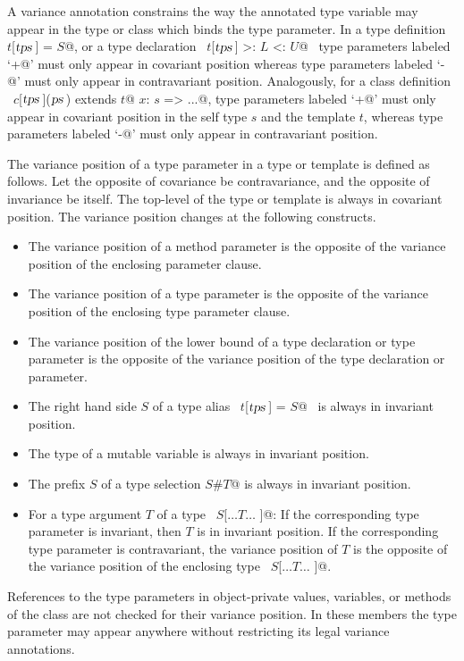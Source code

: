 A variance annotation constrains the way the annotated type variable
may appear in the type or class which binds the type parameter.  In a
type definition ~\lstinline@type $t$[$\mbox{\sl tps}\,$] = $S$@, or a type declaration ~\lstinline@type $t$[$\mbox{\sl tps}\,$] >: $L$ <: $U$@~ type parameters labeled
`\lstinline@+@' must only appear in covariant position whereas
type parameters labeled `\lstinline@-@' must only appear in contravariant
position. Analogously, for a class definition
~\lstinline@class $c$[$\mbox{\sl tps}\,$]($\mbox{\sl ps}\,$) extends $t$@ { $x$: $s$ => ...}@, type parameters labeled
`\lstinline@+@' must only appear in covariant position in the
self type $s$ and the template $t$, whereas type
parameters labeled `\lstinline@-@' must only appear in contravariant
position. 

The variance position of a type parameter in a type or template is
defined as follows.  Let the opposite of covariance be contravariance,
and the opposite of invariance be itself.  The top-level of the type
or template is always in covariant position. The variance position
changes at the following constructs.
\begin{itemize}
\item
The variance position of a method parameter is the opposite of the 
variance position of the enclosing parameter clause.
\item
The variance position of a type parameter is the opposite of the
variance position of the enclosing type parameter clause.
\item
The variance position of the lower bound of a type declaration or type parameter 
is the opposite of the variance position of the type declaration or parameter.  
\item
The right hand side $S$ of a type alias ~\lstinline@type $t$[$\mbox{\sl tps}\,$] = $S$@~ 
is always in invariant position.
\item
The type of a mutable variable is always in invariant position.
\item 
The prefix $S$ of a type selection \lstinline@$S$#$T$@ is always in invariant position.
\item
For a type argument $T$ of a type ~\lstinline@$S$[$\ldots T \ldots$ ]@: If the
corresponding type parameter is invariant, then $T$ is in
invariant position.  If the corresponding type parameter is
contravariant, the variance position of $T$ is the opposite of
the variance position of the enclosing type ~\lstinline@$S$[$\ldots T \ldots$ ]@.
\end{itemize}
References to the type parameters in object-private values, variables,
or methods of the class are not checked for their variance
position. In these members the type parameter may appear anywhere
without restricting its legal variance annotations.

